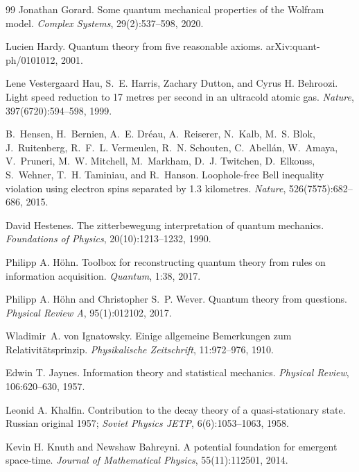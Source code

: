 \documentclass[11pt,a4paper]{article}
\theoremstyle{remark}\newtheorem{remark}[definition]{Remark}
\begin{document}
\begin{thebibliography}{99}
Jonathan Gorard.
\newblock Some quantum mechanical properties of the Wolfram model.
\newblock \emph{Complex Systems}, 29(2):537--598, 2020.

Lucien Hardy.
\newblock Quantum theory from five reasonable axioms.
\newblock arXiv:quant-ph/0101012, 2001.

Lene Vestergaard Hau, S.~E. Harris, Zachary Dutton, and Cyrus H. Behroozi.
\newblock Light speed reduction to 17 metres per second in an ultracold atomic gas.
\newblock \emph{Nature}, 397(6720):594--598, 1999.

B.~Hensen, H.~Bernien, A.~E. Dr\'eau, A.~Reiserer, N.~Kalb, M.~S. Blok, J.~Ruitenberg, R.~F.~L. Vermeulen, R.~N. Schouten, C.~Abell\'an, W.~Amaya, V.~Pruneri, M.~W. Mitchell, M.~Markham, D.~J. Twitchen, D.~Elkouss, S.~Wehner, T.~H. Taminiau, and R.~Hanson.
\newblock Loophole-free {B}ell inequality violation using electron spins separated by 1.3 kilometres.
\newblock \emph{Nature}, 526(7575):682--686, 2015.

David Hestenes.
\newblock The zitterbewegung interpretation of quantum mechanics.
\newblock \emph{Foundations of Physics}, 20(10):1213--1232, 1990.

Philipp A. H\"ohn.
\newblock Toolbox for reconstructing quantum theory from rules on information acquisition.
\newblock \emph{Quantum}, 1:38, 2017.

Philipp A. H\"ohn and Christopher S.~P. Wever.
\newblock Quantum theory from questions.
\newblock \emph{Physical Review A}, 95(1):012102, 2017.

Wladimir~A. von Ignatowsky.
\newblock Einige allgemeine Bemerkungen zum Relativit\"atsprinzip.
\newblock \emph{Physikalische Zeitschrift}, 11:972--976, 1910.

Edwin T. Jaynes.
\newblock Information theory and statistical mechanics.
\newblock \emph{Physical Review}, 106:620--630, 1957.

Leonid A. Khalfin.
\newblock Contribution to the decay theory of a quasi-stationary state.
\newblock Russian original 1957; \emph{Soviet Physics JETP}, 6(6):1053--1063, 1958.

Kevin H. Knuth and Newshaw Bahreyni.
\newblock A potential foundation for emergent space-time.
\newblock \emph{Journal of Mathematical Physics}, 55(11):112501, 2014.


\end{thebibliography}
\end{document}
